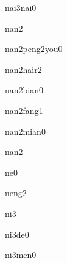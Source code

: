 \begin{multicols*}{2}
\begin{verbete}[奶奶]{nai3nai0}
\end{verbete}

\begin{verbete}[男]{nan2}
\end{verbete}

\begin{verbete}[男朋友]{nan2peng2you0}
\end{verbete}

\begin{verbete}[男孩儿]{nan2hair2}
\end{verbete}

\begin{verbete}[南边]{nan2bian0}
\end{verbete}

\begin{verbete}[南方]{nan2fang1}
\end{verbete}

\begin{verbete}[南面]{nan2mian0}
\end{verbete}

\begin{verbete}[难]{nan2}
\end{verbete}

\begin{verbete}[呢]{ne0}
\end{verbete}

\begin{verbete}[能]{neng2}
\end{verbete}

\begin{verbete}[你]{ni3}
\end{verbete}

\begin{verbete}[你的]{ni3de0}
\end{verbete}

\begin{verbete}[你们]{ni3men0}
\end{verbete}


\end{multicols*}
